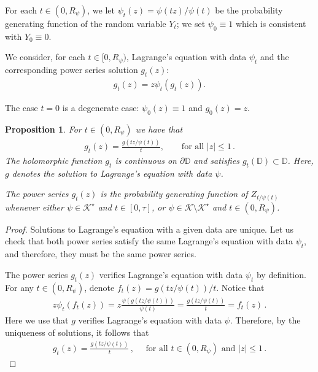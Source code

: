 \documentclass[11pt,a4paper,leqno]{amsart}
\theoremstyle{plain}
\newtheorem{propo}[theo]{Proposition}
\theoremstyle{definition}
\numberwithin{equation}{section}
\begin{document}
	For each $t \in (0,R_{\psi})$, we let $\psi_t(z) = \psi(tz)/\psi(t)$ be the probability generating function of the random variable $Y_t$; we set $\psi_0\equiv1$ which is consistent with $Y_0 \equiv 0$.
	\smallskip
	
	We consider, for each $t \in [0,R_{\psi})$, Lagrange's equation with data $\psi_t$ and the corresponding  power series solution $g_t(z)$:
	\begin{align}\label{eq: Lagrange-probabilitygen}
		g_t(z) = z\psi_t(g_t(z)).
	\end{align}
	
	The case $t = 0$ is a degenerate case: $\psi_0(z) \equiv 1$ and $g_0(z) = z$. 
	
	\begin{propo}\label{lemma: g_t-probgen} For $t \in (0,R_\psi)$ we have that
		\begin{align}\label{eq:identity for gt}
			g_t(z) = \frac{g(tz/\psi(t))}{t}, \quad \quad  \mbox{for all $|z| \leq 1$}\,.
		\end{align}	
		The holomorphic function \( g_t \) is continuous on \( \partial \mathbb{D} \) and satisfies \( g_t(\mathbb{D}) \subset \mathbb{D} \). Here, \( g \) denotes the solution to Lagrange's equation with data \( \psi \).
		\smallskip
		
		The power series \(g_t(z)\) is the probability generating function of \(Z_{t/\psi(t)}\) whenever either \(\psi\in\mathcal{K}^\star\) and \(t\in[0,\tau]\), or \(\psi\in\mathcal{K}\setminus\mathcal{K}^\star\) and \(t\in(0,R_\psi)\).
	\end{propo}
	\begin{proof} Solutions to Lagrange's equation with a given data are unique. Let us check that both power series satisfy the same Lagrange's equation with data \( \psi_t \), and therefore, they must be the same power series.
		\smallskip
		
		The power series $g_t(z)$ verifies Lagrange's equation with data $\psi_t$ by definition. For any $t \in (0,R_{\psi})$, denote $f_t(z) =  {g(tz/\psi(t))}/{t}$. Notice that 
		\begin{align*}
			z\psi_t(f_t(z)) = z\frac{\psi(g(tz/\psi(t)))}{\psi(t)} = \frac{g(tz/\psi(t))}{t} = f_t(z)\,.
		\end{align*}
		Here we use that $g$ verifies Lagrange's equation with data $\psi$. Therefore, by the uniqueness of solutions, it follows that
		\begin{align*}
			g_t(z) = \frac{g(tz/\psi(t))}{t}\,, \quad \text{ for all } t \in (0,R_{\psi}) \text{ and } |z|\leq 1\,.
		\end{align*}
	\end{proof}
	
\end{document}
